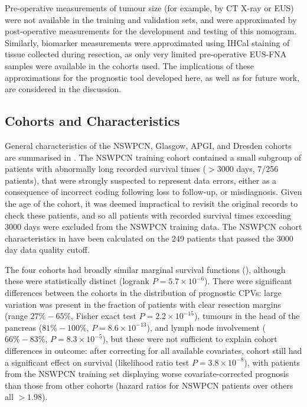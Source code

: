\documentclass[dissertation.tex]{subfiles}
\begin{document}
Pre-operative measurements of tumour size (for example, by \gls{CT} X-ray or \gls{EUS}) were not available in the training and validation sets, and were approximated by post-operative measurements for the development and testing of this nomogram.  Similarly, biomarker measurements were approximated using \gls{IHCal} staining of tissue collected during resection, as only very limited pre-operative \gls{EUS}-\gls{FNA} samples were available in the cohorts used.  The implications of these approximations for the prognostic tool developed here, as well as for future work, are considered in the discussion.  

\subsection{Cohorts and Characteristics}
General characteristics of the \gls{NSWPCN}, Glasgow, \gls{APGI}, and Dresden cohorts are summarised in .  The \gls{NSWPCN} training cohort contained a small subgroup of patients with abnormally long recorded survival times ($> 3000$ days, 7/256 patients), that were strongly suspected to represent data errors, either as a consequence of incorrect coding following loss to follow-up, or misdiagnosis.  Given the age of the cohort, it was deemed impractical to revisit the original records to check these patients, and so all patients with recorded survival times exceeding 3000 days were excluded from the \gls{NSWPCN} training data.  The \gls{NSWPCN} cohort characteristics in  have been calculated on the 249 patients that passed the 3000 day data quality cutoff.

The four cohorts had broadly similar marginal survival functions (), although these were statistically distinct (logrank $P = 5.7 \times 10^{-6}$).  There were significant differences between the cohorts in the distribution of prognostic \glspl{CPV}: large variation was present in the fraction of patients with clear resection margins (range $27\%-65\%$, Fisher exact test $P = 2.2 \times 10^{-15}$), tumours in the head of the pancreas ($81\%-100\%$, $P = 8.6 \times 10^{-13}$), and lymph node involvement ($66\%-83\%$, $P = 8.3 \times 10^{-5}$), but these were not sufficient to explain cohort differences in outcome: after correcting for all available covariates, cohort still had a significant effect on survival (likelihood ratio test $P = 3.8 \times 10^{-8}$), with patients from the \gls{NSWPCN} training set displaying worse covariate-corrected prognosis than those from other cohorts (hazard ratios for \gls{NSWPCN} patients over others all $> 1.98$).  
\end{document}
